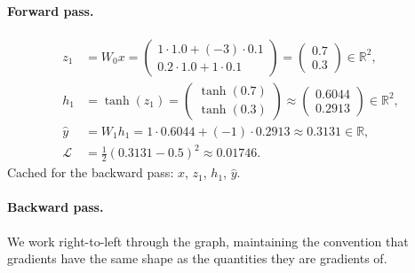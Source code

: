 \documentclass[11pt, a4paper]{article}
\newcommand{\R}{\mathbb{R}}
\newcommand{\Loss}{\mathcal{L}}
\begin{document}
\paragraph{Forward pass.}
\begin{align*}
    z_1 &= W_0 x = \begin{pmatrix} 1\cdot 1.0 + (-3)\cdot 0.1 \\ 0.2 \cdot 1.0 + 1 \cdot 0.1 \end{pmatrix} = \begin{pmatrix} 0.7 \\ 0.3 \end{pmatrix} \in \R^2, \\
    h_1 &= \tanh(z_1) = \begin{pmatrix} \tanh(0.7) \\ \tanh(0.3) \end{pmatrix} \approx \begin{pmatrix} 0.6044 \\ 0.2913 \end{pmatrix} \in \R^2, \\
    \hat y &= W_1 h_1 = 1 \cdot 0.6044 + (-1) \cdot 0.2913 \approx 0.3131 \in \R, \\
    \Loss &= \tfrac{1}{2}(0.3131 - 0.5)^2 \approx 0.01746.
\end{align*}
Cached for the backward pass: $x$, $z_1$, $h_1$, $\hat y$.

\paragraph{Backward pass.} We work right-to-left through the graph, maintaining the convention that gradients have the same shape as the quantities they are gradients of.
\end{document}
